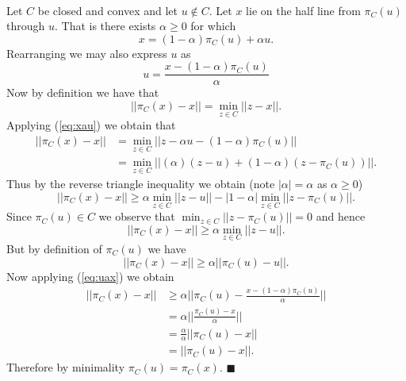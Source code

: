 \documentclass[letterpaper,12pt,oneside,onecolumn]{article}
\begin{document}
\paragraph{}
Let $C$ be closed and convex and let $u \not\in C$. Let $x$ lie on the half line from $\pi_C(u)$ through $u$. That is there exists $\alpha \geq 0$ for which \begin{equation} x = (1-\alpha)\pi_C(u) + \alpha u. \label{eq:xau}\end{equation}
Rearranging we may also express $u$ as
\begin{equation} u = \frac{x - (1-\alpha) \pi_C(u)}{\alpha} \label{eq:uax}\end{equation}
Now by definition we have that $$|| \pi_C(x) -x|| = \min_{z \in C} ||z-x||.$$
Applying (\ref{eq:xau}) we obtain that \begin{align*}||\pi_C(x) - x|| &= \min_{z \in C} || z - \alpha u -(1-\alpha) \pi_C(u)|| \\&= \min_{z\in C} ||(\alpha) (z -  u) + (1-\alpha)(z - \pi_C(u))||.\end{align*}
Thus by the reverse triangle inequality we obtain (note $|\alpha| = \alpha$ as $\alpha \geq 0$)
$$||\pi_C(x) - x|| \geq \alpha \min_{z\in C} ||z-u|| -|1-\alpha| \min_{z\in C} ||z - \pi_C(u)||.$$
Since $\pi_C(u) \in C$ we observe that $\min_{z\in C} ||z - \pi_C(u)|| = 0$ and hence
$$||\pi_C(x) - x|| \geq \alpha \min_{z\in C} ||z - u||.$$
But by definition of $\pi_C(u)$ we have
$$||\pi_C(x) - x || \geq \alpha ||\pi_C(u) - u||.$$
Now applying (\ref{eq:uax}) we obtain
\begin{align*}
||\pi_C(x) - x|| &\geq \alpha ||\pi_C(u) - \frac{x- (1-\alpha)\pi_C(u)}{\alpha}|| \\
&=\alpha ||\frac{\pi_C(u) - x}{\alpha}|| \\
&= \frac{\alpha}{\alpha} ||\pi_C(u) - x|| \\
&= ||\pi_C(u) - x||.
\end{align*}
Therefore by minimality $\pi_C(u) = \pi_C(x)$. $\blacksquare$
\end{document}
